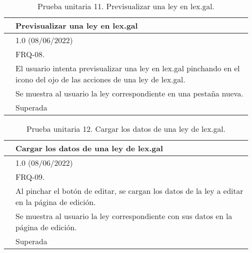 \begin{table}[H]
\begin{center}
\begin{tabular}{|p{3cm}|p{10cm}|} \hline
\centering {\bf PU-11} & Previsualizar una ley en lex.gal  \\ \hline\hline
\centering {\bf Versión} & 1.0 (08/06/2022) \\ \hline
\centering {\bf Dependencias} & FRQ-08. \\ \hline
\centering {\bf Descripción} &  El usuario intenta previsualizar una ley en lex.gal pinchando en el icono del ojo de las acciones de una ley de lex.gal. \\ \hline
\centering {\bf Criterio de aceptación} & Se muestra al usuario la ley correspondiente en una pestaña nueva. \\ \hline
\centering {\bf Estado} & Superada \\ \hline
\end{tabular}
\caption{Prueba unitaria 11. Previsualizar una ley en lex.gal.}
\label{enlacePU11}
\end{center}
\end{table}

\begin{table}[H]
\begin{center}
\begin{tabular}{|p{3cm}|p{10cm}|} \hline
\centering {\bf PU-12} & Cargar los datos de una ley de lex.gal  \\ \hline\hline
\centering {\bf Versión} & 1.0 (08/06/2022) \\ \hline
\centering {\bf Dependencias} & FRQ-09. \\ \hline
\centering {\bf Descripción} &  Al pinchar el botón de editar, se cargan los datos de la ley a editar en la página de edición. \\ \hline
\centering {\bf Criterio de aceptación} & Se muestra al usuario la ley correspondiente con sus datos en la página de edición. \\ \hline
\centering {\bf Estado} & Superada \\ \hline
\end{tabular}
\caption{Prueba unitaria 12. Cargar los datos de una ley de lex.gal.}
\label{enlacePU12}
\end{center}
\end{table}

